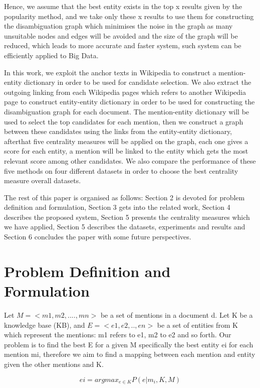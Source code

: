 \documentclass{llncs}
\begin{document}
Hence, we assume that the best entity exists in the top x results given by the popularity method, and we take only these x results to use them for constructing the disambiguation graph which minimises the noise in the graph as many unsuitable nodes and edges will be avoided and the size of the graph will be reduced,  which leads to  more accurate and  faster system, such system can be efficiently applied to Big Data.

In this work,  we exploit the anchor texts in Wikipedia to construct a mention-entity dictionary in order to be used for candidate selection. We also extract the outgoing linking from each Wikipedia pages which refers to another Wikipedia page to construct entity-entity dictionary in order to be used for constructing the disambiguation graph for each document. The mention-entity dictionary will be used to select the top candidates for each mention, then we construct a graph between these candidates using the links from the entity-entity dictionary, afterthat five centrality measures will be applied on the graph, each one gives a score for each entity, a mention will be linked to the entity which gets the most relevant score among other candidates. We also compare the performance of these five methods on four different datasets in order to choose the best centrality measure overall datasets.

The rest of this paper is organised as follows: Section 2 is devoted for problem definition and formulation, Section 3 gets into the related work, Section 4 describes the proposed system, Section 5 presents the centrality measures which we have applied, Section 5 describes the datasets,  experiments and results and Section 6 concludes the paper with some future perspectives.

\section{Problem Definition and Formulation}

Let $M=<m1, m2, ...., mn>$ be a set of mentions in a document d. Let K be a knowledge base (KB), and $E=<e1, e2, ..,en>$ be a set of entities from K which represent the mentions: m1 refers to e1, m2 to e2 and so forth.  Our problem is to find the best E for a given M specifically the best entity ei for each mention mi, therefore we aim to find a mapping between each mention and entity given the other mentions and  K.

$$ei= argmax_{e \in K} {P(e|m_{i},K,M)}$$
\end{document}
